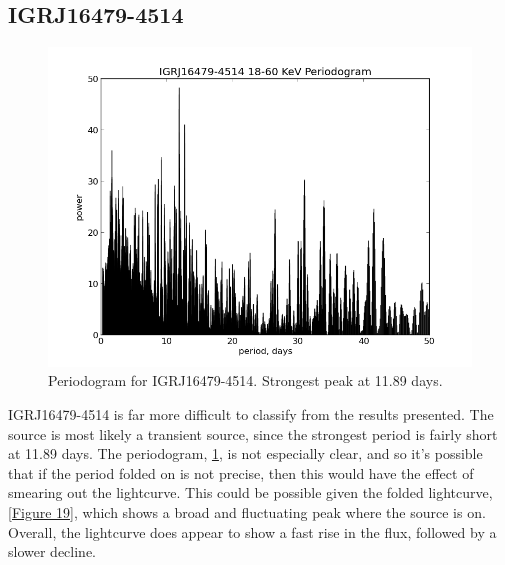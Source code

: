 \clearpage

\subsection{IGRJ16479-4514}

\begin{figure}[h!]
\centering
\includegraphics[width=130mm]{gfx/Fig18.png}
\caption{Periodogram for IGRJ16479-4514. Strongest peak at 11.89 days.}
\label{Figure 18}
\end{figure} 

IGRJ16479-4514 is far more difficult to classify from the results presented. The source is most likely a transient source, since the strongest period is fairly short at 11.89 days. The periodogram, \ref{Figure 18}, is not especially clear, and so it\textquoteright{}s possible that if the period folded on is not precise, then this would have the effect of smearing out the lightcurve. This could be possible given the folded lightcurve, \ref{Figure 19}, which shows a broad and fluctuating peak where the source is on. Overall, the lightcurve does appear to show a fast rise in the flux, followed by a slower decline. 

